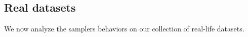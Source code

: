 \documentclass[runningheads]{llncs}
\def\bf{\bfseries}
\begin{document}
\subsection{Real datasets}

We now analyze the samplers behaviors on our collection of real-life datasets.




%
% 
% 
% 
\end{document}
